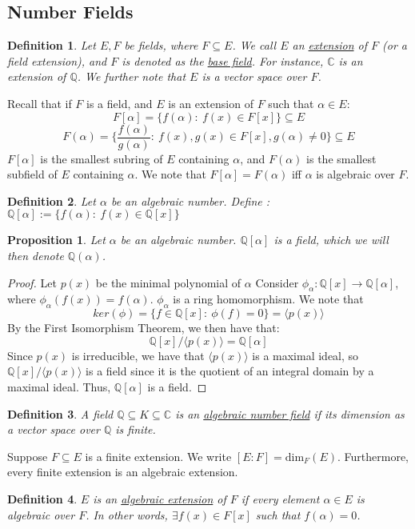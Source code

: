 \documentclass{article}
\newcommand{\C}{\mathbb{C}}
\newcommand{\Q}{\mathbb{Q}}
\newtheorem{proposition}{Proposition}[subsection]
\newtheorem{definition}{Definition}[subsection]
\begin{document}
\subsection{Number Fields}
\begin{definition}
Let $E,F$ be fields, where $F\subseteq E$. We call $E$ an \underline{extension} of $F$ (or a field extension), and $F$ is denoted as the \underline{base field}. For instance, $\C$ is an extension of $\Q$. We further note that $E$ is a vector space over $F$.
\end{definition}
\noindent Recall that if $F$ is a field, and $E$ is an extension of $F$ such that $\alpha\in E$:
$$F[\alpha]=\{f(\alpha):\ f(x)\in F[x]\}\subseteq E$$
$$F(\alpha)=\{\frac{f(\alpha)}{g(\alpha)}:\ f(x),g(x)\in F[x], g(\alpha)\neq 0\}\subseteq E$$
\noindent $F[\alpha]$ is the smallest subring of $E$ containing $\alpha$, and $F(\alpha)$ is the smallest subfield of $E$ containing $\alpha$. We note that $F[\alpha]=F(\alpha)$ iff $\alpha$ is algebraic over $F$.
\begin{definition}
Let $\alpha$ be an algebraic number. Define :
$\Q[\alpha]:=\{f(\alpha):\ f(x)\in\Q[x]\}$
\end{definition}
\begin{proposition}
Let $\alpha$ be an algebraic number. $\Q[\alpha]$ is a field, which we will then denote $\Q(\alpha)$.
\end{proposition}
\begin{proof}
Let $p(x)$ be the minimal polynomial of $\alpha$ Consider $\phi_\alpha: \Q[x]\rightarrow \Q[\alpha]$, where $\phi_\alpha(f(x))=f(\alpha)$. $\phi_\alpha$ is a ring homomorphism. We note that $$ker(\phi)=\{f\in\Q[x]:\ \phi(f)=0\}=\langle p(x)\rangle$$
By the First Isomorphism Theorem, we then have that:
$$\Q[x]/\langle p(x)\rangle = \Q[\alpha]$$
Since $p(x)$ is irreducible, we have that $\langle p(x)\rangle$ is a maximal ideal, so $\Q[x]/\langle p(x)\rangle$ is a field since it is the quotient of an integral domain by a maximal ideal. Thus, $\Q[\alpha]$ is a field.
\end{proof}
\begin{definition}
A field $\Q\subseteq K\subseteq \C$ is an \underline{algebraic number field} if its dimension as a vector space over $\Q$ is finite.
\end{definition}
\noindent Suppose $F\subseteq E$ is a finite extension. We write $[E:F]=\text{dim}_F(E)$. Furthermore, every finite extension is an algebraic extension. 
\begin{definition}
$E$ is an \underline{algebraic extension} of $F$ if every element $\alpha\in E$ is algebraic over $F$. In other words, $\exists f(x)\in F[x]$ such that $f(\alpha)=0$.
\end{definition}
\end{document}
